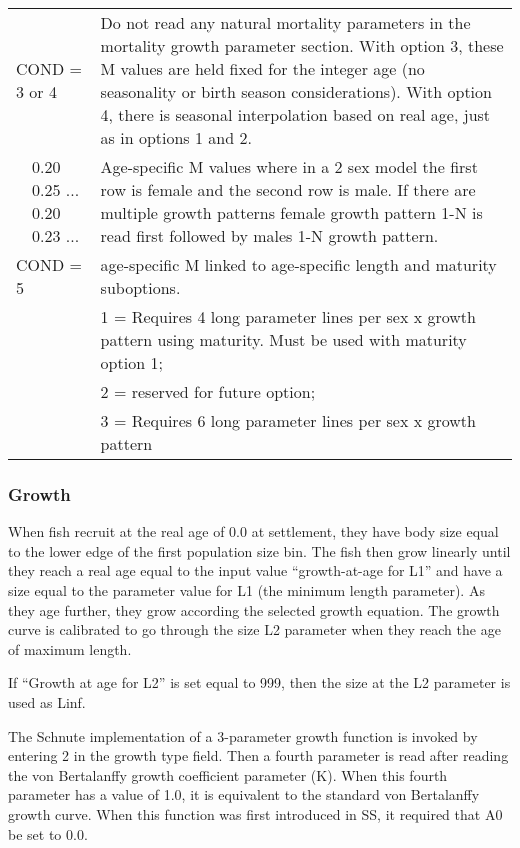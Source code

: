 \begin{longtable}{p{0.5cm} p{2cm} p{12.75cm}}
	\multicolumn{2}{l}{COND = 3 or 4} \Tstrut & Do not read any natural mortality parameters in the mortality growth parameter section.  With option 3, these M values are held fixed for the integer age (no seasonality or birth season considerations). With option 4, there is seasonal interpolation based on real age, just as in options 1 and 2.\\

	& 0.20 0.25 ... 0.20 0.23 ... & Age-specific M values where in a 2 sex model the first row is female and the second row is male. If there are multiple growth patterns female growth pattern 1-N is read first followed by males 1-N growth pattern.\Bstrut\\
	\hline
	
	\multicolumn{2}{l}{COND = 5} \Tstrut & age-specific M linked to age-specific length and maturity suboptions. \\

	&  & 1 = Requires 4 long parameter lines per sex x growth pattern using maturity. Must be used with maturity option 1; \\
	&  & 2 = reserved for future option; \\
	&  & 3 = Requires 6 long parameter lines per sex x growth pattern\Bstrut\\
	\hline
\end{longtable}

\subsubsection{Growth}

When fish recruit at the real age of 0.0 at settlement, they have body size equal to the lower edge of the first population size bin.  The fish then grow linearly until they reach a real age equal to the input value “growth-at-age for L1” and have a size equal to the parameter value for L1 (the minimum length parameter).  As they age further, they grow according the selected growth equation.  The growth curve is calibrated to go through the size L2 parameter when they reach the age of maximum length.
	
If “Growth at age for L2” is set equal to 999, then the size at the L2 parameter is used as Linf. 
	
The Schnute implementation of a 3-parameter growth function is invoked by entering 2 in the growth type field.  Then a fourth parameter is read after reading the von Bertalanffy growth coefficient parameter (K). When this fourth parameter has a value of 1.0, it is equivalent to the standard von Bertalanffy growth curve.  When this function was first introduced in SS, it required that A0 be set to 0.0.
	
